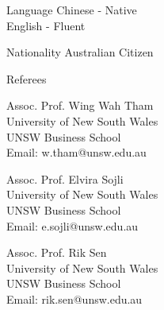 \documentclass{resume} %
\begin{document}
\begin{rSection}{Language}
	Chinese - Native\\
	English - Fluent
\end{rSection}

\begin{rSection}{Nationality}
	Australian Citizen
\end{rSection}

\begin{rSection}{Referees} \itemsep -3pt
	\begin{multicols}{2}
		Assoc. Prof. Wing Wah Tham\\
		University of New South Wales\\
		UNSW Business School\\
		Email: w.tham@unsw.edu.au

		Assoc. Prof. Elvira Sojli\\
		University of New South Wales\\
		UNSW Business School\\
		Email: e.sojli@unsw.edu.au\\
		\columnbreak

		Assoc. Prof. Rik Sen\\
		University of New South Wales\\
		UNSW Business School\\
		Email: rik.sen@unsw.edu.au
	\end{multicols}

\end{rSection}
\end{document}

